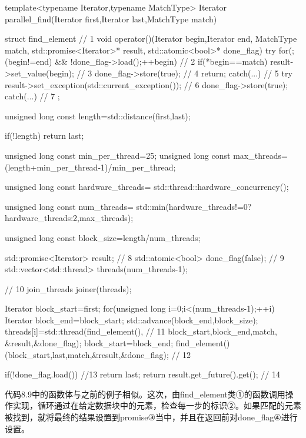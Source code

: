 \begin{cpp}
template<typename Iterator,typename MatchType>
Iterator parallel_find(Iterator first,Iterator last,MatchType match)
{
  struct find_element  // 1
  {
    void operator()(Iterator begin,Iterator end,
                    MatchType match,
                    std::promise<Iterator>* result,
                    std::atomic<bool>* done_flag)
    {
      try
      {
        for(;(begin!=end) && !done_flag->load();++begin)  // 2
        {
          if(*begin==match)
          {
            result->set_value(begin);  // 3
            done_flag->store(true);  // 4
            return;
          }
        }
      }
      catch(...)  // 5
      {
        try
        {
          result->set_exception(std::current_exception());  // 6
          done_flag->store(true);
        }
        catch(...)  // 7
        {}
      }
    }
  };

  unsigned long const length=std::distance(first,last);

  if(!length)
    return last;

  unsigned long const min_per_thread=25;
  unsigned long const max_threads=
    (length+min_per_thread-1)/min_per_thread;

  unsigned long const hardware_threads=
    std::thread::hardware_concurrency();

  unsigned long const num_threads=
    std::min(hardware_threads!=0?hardware_threads:2,max_threads);

  unsigned long const block_size=length/num_threads;

  std::promise<Iterator> result;  // 8
  std::atomic<bool> done_flag(false);  // 9
  std::vector<std::thread> threads(num_threads-1);
  {  // 10
    join_threads joiner(threads);

    Iterator block_start=first;
    for(unsigned long i=0;i<(num_threads-1);++i)
    {
      Iterator block_end=block_start;
      std::advance(block_end,block_size);
      threads[i]=std::thread(find_element(),  // 11
                             block_start,block_end,match,
                             &result,&done_flag);
      block_start=block_end;
    }
    find_element()(block_start,last,match,&result,&done_flag);  // 12
  }
  if(!done_flag.load())  //13
  {
    return last;
  }
  return result.get_future().get();  // 14
}
\end{cpp}

代码8.9中的函数体与之前的例子相似。这次，由find\_element类①的函数调用操作实现，循环通过在给定数据块中的元素，检查每一步的标识②。如果匹配的元素被找到，就将最终的结果设置到promise③当中，并且在返回前对done\_flag④进行设置。

